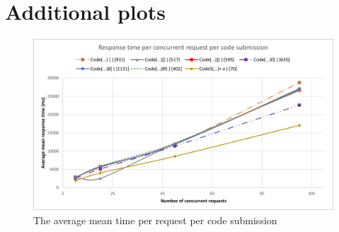 \chapter{Additional plots} \label{chap:AdditionalPlots}
\begin{figure}[H]
    \centering
    \includegraphics[width=\textwidth,height=\textheight,keepaspectratio]{images/Aveage per code.png}
    \caption{The average mean time per request per code submission}
    \label{fig:averagePerCode}
\end{figure}